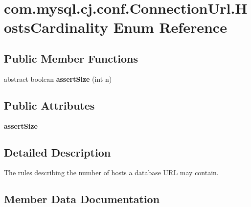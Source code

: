 \hypertarget{enumcom_1_1mysql_1_1cj_1_1conf_1_1_connection_url_1_1_hosts_cardinality}{}\section{com.\+mysql.\+cj.\+conf.\+Connection\+Url.\+Hosts\+Cardinality Enum Reference}
\label{enumcom_1_1mysql_1_1cj_1_1conf_1_1_connection_url_1_1_hosts_cardinality}
\subsection*{Public Member Functions}
\begin{DoxyCompactItemize}
\item 
\mbox{\label{enumcom_1_1mysql_1_1cj_1_1conf_1_1_connection_url_1_1_hosts_cardinality_ac284db6b3b9a93d35d400c1d05cfb717}} 
abstract boolean {\bfseries assert\+Size} (int n)
\end{DoxyCompactItemize}
\subsection*{Public Attributes}
\begin{DoxyCompactItemize}
\item 
{\bfseries assert\+Size}
\end{DoxyCompactItemize}


\subsection{Detailed Description}
The rules describing the number of hosts a database U\+RL may contain. 

\subsection{Member Data Documentation}
\mbox{\label{enumcom_1_1mysql_1_1cj_1_1conf_1_1_connection_url_1_1_hosts_cardinality_a841d1e01689174a7e5f02fe698ccbd5f}} 
